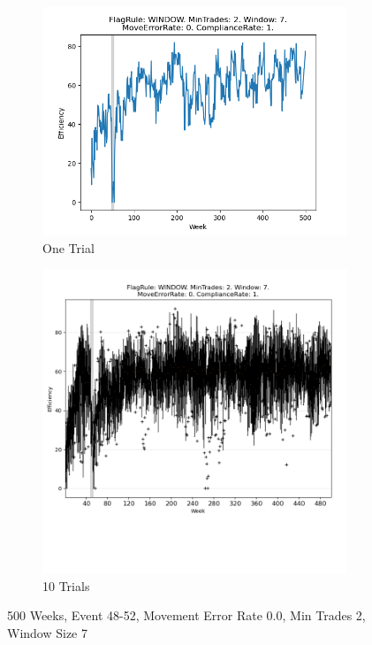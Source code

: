 \documentclass{article}%
\begin{document}
\begin{figure}[!htb]%
\begin{subfigure}[b]{0.45\linewidth}%
\includegraphics[width=\linewidth]{1052fr_WINDOW_mt_2_ws_7_er_0_cr_1_t1.png}%
\caption{One Trial}%
\end{subfigure}%
\begin{subfigure}[b]{0.45\linewidth}%
\includegraphics[clip,width=\linewidth,trim=0 4cm 0 0]{1052fr_WINDOW_mt_2_ws_7_er_0_cr_1_t10.png}%
\caption{10 Trials}%
\end{subfigure}%
\caption{500 Weeks, Event 48{-}52, Movement Error Rate 0.0, Min Trades 2, Window Size 7}%
\end{figure}
\end{document}
